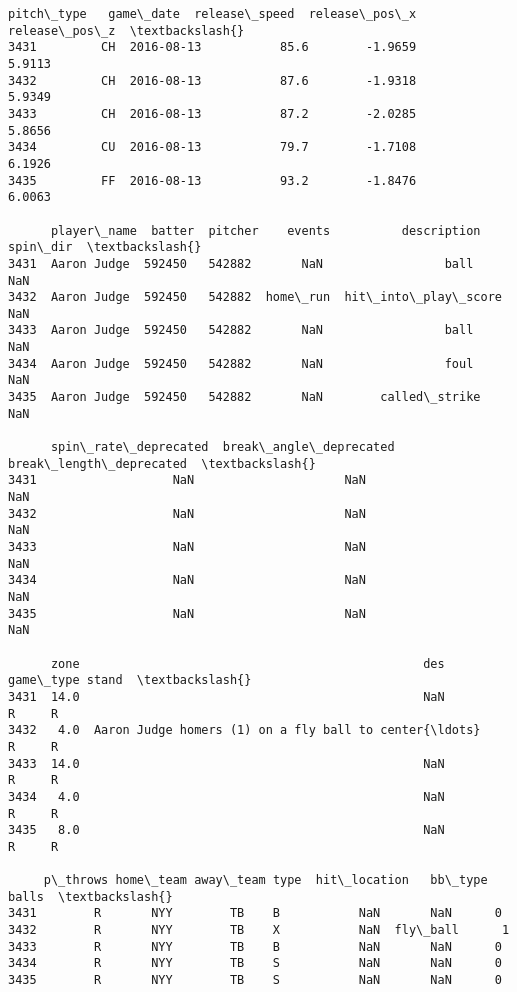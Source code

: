\documentclass[11pt]{article}
\begin{document}
    \begin{Verbatim}[commandchars=\\\{\}]
     pitch\_type   game\_date  release\_speed  release\_pos\_x  release\_pos\_z  \textbackslash{}
3431         CH  2016-08-13           85.6        -1.9659         5.9113   
3432         CH  2016-08-13           87.6        -1.9318         5.9349   
3433         CH  2016-08-13           87.2        -2.0285         5.8656   
3434         CU  2016-08-13           79.7        -1.7108         6.1926   
3435         FF  2016-08-13           93.2        -1.8476         6.0063   

      player\_name  batter  pitcher    events          description  spin\_dir  \textbackslash{}
3431  Aaron Judge  592450   542882       NaN                 ball       NaN   
3432  Aaron Judge  592450   542882  home\_run  hit\_into\_play\_score       NaN   
3433  Aaron Judge  592450   542882       NaN                 ball       NaN   
3434  Aaron Judge  592450   542882       NaN                 foul       NaN   
3435  Aaron Judge  592450   542882       NaN        called\_strike       NaN   

      spin\_rate\_deprecated  break\_angle\_deprecated  break\_length\_deprecated  \textbackslash{}
3431                   NaN                     NaN                      NaN   
3432                   NaN                     NaN                      NaN   
3433                   NaN                     NaN                      NaN   
3434                   NaN                     NaN                      NaN   
3435                   NaN                     NaN                      NaN   

      zone                                                des game\_type stand  \textbackslash{}
3431  14.0                                                NaN         R     R   
3432   4.0  Aaron Judge homers (1) on a fly ball to center{\ldots}         R     R   
3433  14.0                                                NaN         R     R   
3434   4.0                                                NaN         R     R   
3435   8.0                                                NaN         R     R   

     p\_throws home\_team away\_team type  hit\_location   bb\_type  balls  \textbackslash{}
3431        R       NYY        TB    B           NaN       NaN      0   
3432        R       NYY        TB    X           NaN  fly\_ball      1   
3433        R       NYY        TB    B           NaN       NaN      0   
3434        R       NYY        TB    S           NaN       NaN      0   
3435        R       NYY        TB    S           NaN       NaN      0   


\end{Verbatim}
\end{document}
